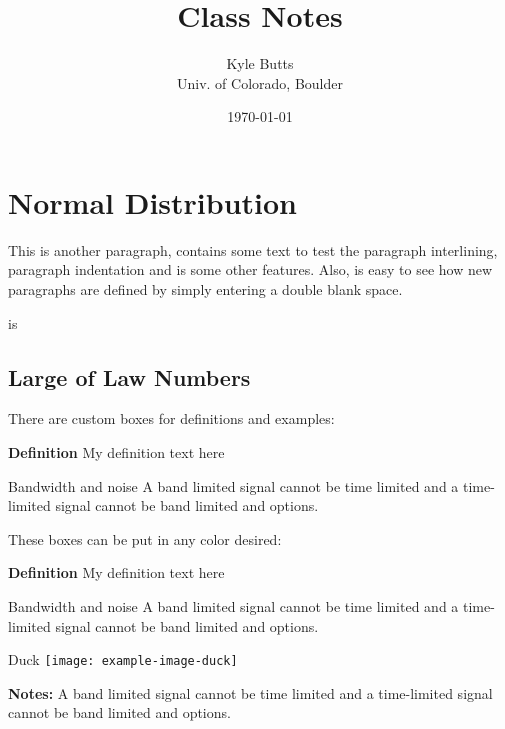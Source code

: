 \documentclass[11pt]{article}
\title{Class Notes}
\author{\normalsize Kyle Butts\\{\footnotesize Univ. of Colorado, Boulder}}
\date{\footnotesize\today}
\begin{document}
\maketitle





\section{Normal Distribution}

This is another paragraph, contains some text to test the paragraph
interlining, paragraph indentation and  is some other features. Also, is easy to see how new paragraphs are defined by simply entering a 
double blank space.

 is 





\subsection{Large of Law Numbers}


There are custom boxes for definitions and examples:

\begin{def_box}[accent]
    \textbf{Definition} My definition text here
\end{def_box}

\begin{example_box}[accent]{Bandwidth and noise}
    A band limited signal cannot be time limited and a time-limited signal cannot be band limited and options.
\end{example_box}

These boxes can be put in any color desired:

\begin{def_box}
    \textbf{Definition} My definition text here
\end{def_box}

\begin{example_box}{Bandwidth and noise}
    A band limited signal cannot be time limited and a time-limited signal cannot be band limited and options.
\end{example_box}


\begin{myfigure}{Duck}
    \texttt{[image: example-image-duck]}
    
    \tcblower
    \textbf{Notes:} A band limited signal cannot be time limited and a time-limited signal cannot be band limited and options.
\end{myfigure}
\end{document}
